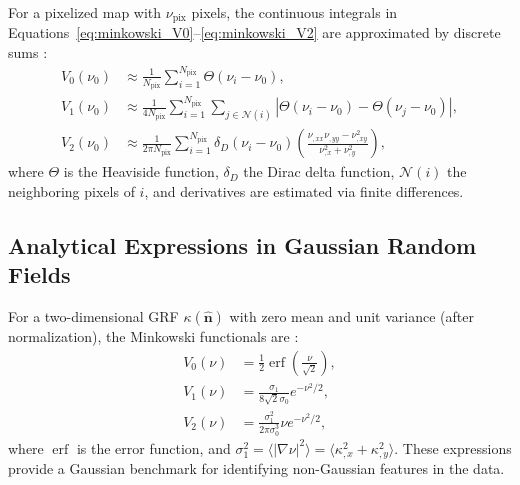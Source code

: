 For a pixelized map with $\nu_{\mathrm{pix}}$ pixels, the continuous integrals in Equations~\eqref{eq:minkowski_V0}--\eqref{eq:minkowski_V2} are approximated by discrete sums \citep{2012PhRvD..85j3513K}:
\begin{align}
    V_0(\nu_0) &\approx \frac{1}{N_{\mathrm{pix}}} \sum_{i=1}^{N_{\mathrm{pix}}} \Theta(\nu_i - \nu_0), \label{eq:V0_discrete} \\
    V_1(\nu_0) &\approx \frac{1}{4N_{\mathrm{pix}}} \sum_{i=1}^{N_{\mathrm{pix}}} \sum_{j \in \mathcal{N}(i)} |\Theta(\nu_i - \nu_0) - \Theta(\nu_j - \nu_0)|, \label{eq:V1_discrete} \\
    V_2(\nu_0) &\approx \frac{1}{2\pi N_{\mathrm{pix}}} \sum_{i=1}^{N_{\mathrm{pix}}} \delta_D(\nu_i - \nu_0) \left( \frac{\nu_{,xx} \nu_{,yy} - \nu_{,xy}^2}{\nu_{,x}^2 + \nu_{,y}^2} \right), \label{eq:V2_discrete}
\end{align}
where $\Theta$ is the Heaviside function, $\delta_D$ the Dirac delta function, $\mathcal{N}(i)$ the neighboring pixels of $i$, and derivatives are estimated via finite differences.

\subsection{Analytical Expressions in Gaussian Random Fields}
For a two-dimensional GRF $\kappa(\hat{\mathbf{n}})$ with zero mean and unit variance (after normalization), the Minkowski functionals are \citep{2010PhRvD..81h3505M}: 
\begin{align}
    V_0(\nu) &= \frac{1}{2} \operatorname{erf}\left( \frac{\nu}{\sqrt{2}} \right), \label{eq:V0_GRF} \\
    V_1(\nu) &= \frac{\sigma_1}{8\sqrt{2}\sigma_0} e^{-\nu^2/2}, \label{eq:V1_GRF} \\
    V_2(\nu) &= \frac{\sigma_1^2}{2\pi \sigma_0^3} \nu e^{-\nu^2/2}, \label{eq:V2_GRF}
\end{align}
where $\operatorname{erf}$ is the error function, and $\sigma_1^2 = \langle |\nabla \nu|^2 \rangle = \langle \kappa_{,x}^2 + \kappa_{,y}^2 \rangle$. These expressions provide a Gaussian benchmark for identifying non-Gaussian features in the data.